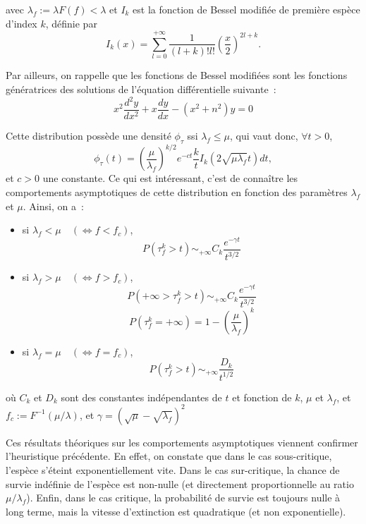 \documentclass[12pt,a4paper]{article}
\begin{document}
avec $\lambda_f := \lambda F(f) < \lambda$ et $I_k$ est la fonction de Bessel modifiée de première espèce d'index $k$, définie par $$  I_k(x) = \sum_{l=0}^{+\infty} \frac{1}{(l+k)!l!}\left(\frac{x}{2}\right)^{2l+k}. $$

Par ailleurs, on rappelle que les fonctions de Bessel modifiées sont les fonctions génératrices des solutions de l’équation différentielle suivante : $$ x^2 \frac{d^2 y}{dx^2} + x \frac{dy}{dx} - (x^2+n^2) y = 0$$ 


Cette distribution possède une densité $\phi_\tau$ ssi $\lambda_f \leq \mu$, qui vaut donc, $\forall t > 0$, $$\phi_\tau(t) = \left(\frac{\mu}{\lambda_f}\right)^{k/2}e^{-ct}\frac{k}{t}I_k(2\sqrt{\mu\lambda_f}t)dt, $$ et $c > 0$ une constante.
Ce qui est intéressant, c’est de connaître les comportements asymptotiques de cette distribution en fonction des paramètres $\lambda_f$ et $\mu$. Ainsi, on a : 
\begin{itemize}
    \item si $\lambda_f < \mu \quad(\Longleftrightarrow f < f_c)$, $$ P(\tau_f^k > t) \sim_{+\infty} C_k\frac{e^{-\gamma t}}{t^{3/2}} $$

    \item si $\lambda_f > \mu \quad(\Longleftrightarrow f >f_c)$, $$ P(+\infty > \tau_f^k > t) \sim_{+\infty} C_k\frac{e^{-\gamma t}}{t^{3/2}} $$ $$ P(\tau_f^k =+\infty) = 1 - \left(\frac{\mu}{\lambda_f}\right)^k $$

    \item si $\lambda_f = \mu \quad(\Longleftrightarrow f = f_c)$, $$ P(\tau_f^k > t) \sim_{+\infty} \frac{D_k}{t^{1/2}}$$
\end{itemize}

où $C_k$ et $D_k$ sont des constantes indépendantes de $t$ et fonction de $k$, $\mu$ et $\lambda_f$, et $f_c := F^{-1}(\mu / \lambda)$, et $\gamma = (\sqrt{\mu} - \sqrt{\lambda_f})^2$\par

Ces résultats théoriques sur les comportements asymptotiques viennent confirmer l'heuristique précédente. En effet, on constate que dans le cas sous-critique, l'espèce s'éteint exponentiellement vite. Dans le cas sur-critique, la chance de survie indéfinie de l'espèce est non-nulle (et directement proportionnelle au ratio $\mu/\lambda_f$). Enfin, dans le cas critique, la probabilité de survie est toujours nulle à long terme, mais la vitesse d'extinction est quadratique (et non exponentielle).
\end{document}
